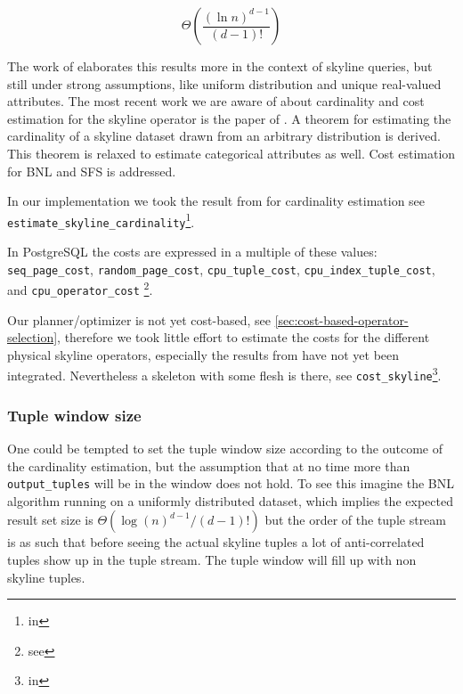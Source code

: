 \begin{equation}
\Theta\left(\frac{(\ln n)^{d-1}}{(d-1)!}\right)
\end{equation}

\noindent
The work of \citet{Godfrey2002} elaborates this results more in the
context of skyline queries, but still under strong assumptions, like
uniform distribution and unique real-valued attributes.
%
The most recent work we are aware of about cardinality and cost
estimation for the skyline operator is the paper of
\citet{Chaudhuri2006}. A theorem for estimating the cardinality of a skyline
dataset drawn from an arbitrary distribution is derived.  This theorem is
relaxed to estimate categorical attributes as well. Cost estimation
for BNL and SFS is addressed.

In our implementation we took the result from \citet{Buchta1989} for
cardinality estimation see \texttt{estimate\_skyline\_cardinality}\footnote{in
}.

In PostgreSQL the costs are expressed in a multiple of these values:
\texttt{seq\_page\_cost}, \texttt{random\_page\_cost}, \texttt{cpu\_tuple\_cost},
\texttt{cpu\_index\_tuple\_cost}, and \texttt{cpu\_operator\_cost}
\footnote{see }.

Our planner/optimizer is not yet cost-based, see
\autoref{sec:cost-based-operator-selection}, therefore we took little
effort to estimate the costs for the different physical skyline
operators, especially the results from \citet{Chaudhuri2006} have not
yet been integrated. Nevertheless a skeleton with some flesh is there,
see \texttt{cost\_skyline}\footnote{in
}.

\subsubsection{Tuple window size}
One could be tempted to set the tuple window size according to the
outcome of the cardinality estimation, but the assumption that at no
time more than \texttt{output\_tuples} will be in the window does not
hold. To see this imagine the BNL algorithm running on a uniformly
distributed dataset, which implies the expected result set size is
$\Theta(\log(n)^{d-1} / (d-1)!)$ but the order of the tuple stream is
as such that before seeing the actual skyline tuples a lot of
anti-correlated tuples show up in the tuple stream.  The tuple window
will fill up with non skyline tuples.

